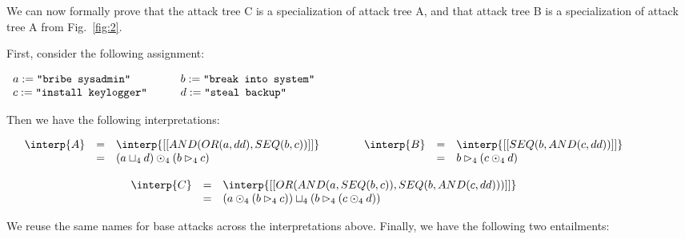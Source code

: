 We can now formally prove that the attack tree C is a specialization
of attack tree A, and that attack tree B is a specialization of attack
tree A from Fig.~\ref{fig:2}.
\begin{example}
  \label{ex:ex1}
  First, consider the following assignment:
\begin{center}
  \begin{math}
    \begin{array}{lllllll}
      a := \verb!"bribe sysadmin"!
      & \quad &
      b := \verb!"break into system"!
      \\
      c := \verb!"install keylogger"!
      & \quad &
      d := \verb!"steal backup"!
    \end{array}
  \end{math}
\end{center}
Then we have the following interpretations:
\begin{center}
  \footnotesize
  \begin{math}
    \begin{array}{c}
      \begin{array}{ccc}
        \begin{array}{rclcl}
        \interp{A} & = & \interp{[[AND(OR(a,dd),SEQ(b,c))]]} \\
                   & = & (a \sqcup_4 d) \odot_4 (b \rhd_4 c)\\
      \end{array}
      & \quad &
      \begin{array}{rclcl}
        \interp{B} & = & \interp{[[SEQ(b,AND(c,dd))]]} \\
                   & = & b \rhd_4 (c \odot_4 d)\\      
      \end{array}
      \end{array}
      \\ \\
      \begin{array}{rclcl}
        \interp{C} & = & \interp{[[OR(AND(a,SEQ(b,c)),SEQ(b,AND(c,dd)))]]}\\
                   & = & (a \odot_4 (b \rhd_4 c)) \sqcup_4 (b \rhd_4 (c \odot_4 d))\\
      \end{array}
    \end{array}        
  \end{math}
\end{center}
We reuse the same names for base attacks across the interpretations
above.  Finally, we have the following two entailments:

\end{example}
